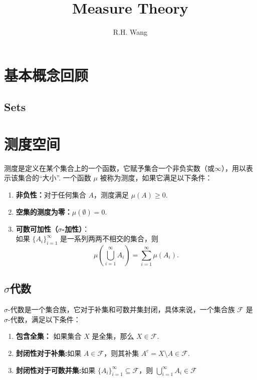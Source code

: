 \documentclass[UTF8,12pt,AutoFakeBold]{ctexart}
\title{Measure Theory}
\author{R.H. Wang}
\date{}
\numberwithin{equation}{section}%
\begin{document}
	\kaishu
	\maketitle
	
	\vspace{1cm}
	\tableofcontents
	
	\newpage
	\kaishu
	\section{基本概念回顾}
	\subsection{Sets}
	
	\section{测度空间}
	
	\begin{definition}[测度]
		测度是定义在某个集合上的一个函数，它赋予集合一个非负实数（或$\infty$），用以表示该集合的“大小”. 一个函数 $\mu$ 被称为测度，如果它满足以下条件：
		\begin{enumerate}
			\item \textbf{非负性：}对于任何集合 $A$，测度满足 $\mu(A) \geq 0$.
			\item \textbf{空集的测度为零：}$\mu(\emptyset) = 0$.
			\item \textbf{可数可加性（$\sigma$-加性）}：\\
			如果 $\{A_i\}_{i=1}^\infty$ 是一系列两两不相交的集合，则
			\[
			\mu\left(\bigcup_{i=1}^\infty A_i\right) = \sum_{i=1}^\infty \mu(A_i).
			\]
		\end{enumerate}
		
	\end{definition}
	
	\subsection{$\sigma$代数}
	\begin{definition}
		$\sigma$-代数是一个集合族，它对于补集和可数并集封闭，具体来说，一个集合族 $\mathcal{F}$ 是 $\sigma$-代数，满足以下条件：
		\begin{enumerate}
			\item \textbf{包含全集：} 如果集合 $X$ 是全集，那么 $X \in \mathcal{F}$.
			\item \textbf{封闭性对于补集:}如果 $A \in \mathcal{F}$，则其补集 $A^c = X \setminus A \in \mathcal{F}$.
			\item \textbf{封闭性对于可数并集:}如果 $\{A_i\}_{i=1}^\infty \subseteq \mathcal{F}$，则 $\bigcup_{i=1}^\infty A_i \in \mathcal{F}$
		\end{enumerate}
		
	\end{definition}
	
\end{document}

